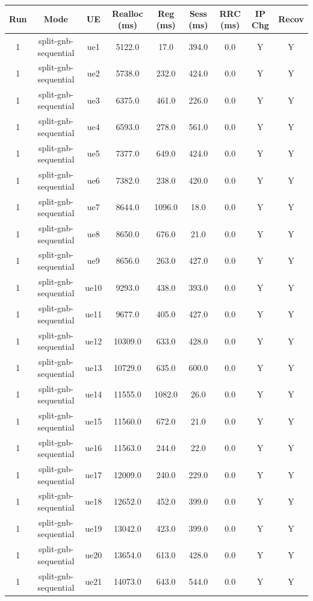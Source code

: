 \begin{table}[ht]
\centering
\begin{tabular}{|c|c|c|c|c|c|c|c|c|}
\hline
Run & Mode & UE & Realloc (ms) & Reg (ms) & Sess (ms) & RRC (ms) & IP Chg & Recov \\
\hline
1 & split-gnb-sequential & ue1 & 5122.0 & 17.0 & 394.0 & 0.0 & Y & Y \\
1 & split-gnb-sequential & ue2 & 5738.0 & 232.0 & 424.0 & 0.0 & Y & Y \\
1 & split-gnb-sequential & ue3 & 6375.0 & 461.0 & 226.0 & 0.0 & Y & Y \\
1 & split-gnb-sequential & ue4 & 6593.0 & 278.0 & 561.0 & 0.0 & Y & Y \\
1 & split-gnb-sequential & ue5 & 7377.0 & 649.0 & 424.0 & 0.0 & Y & Y \\
1 & split-gnb-sequential & ue6 & 7382.0 & 238.0 & 420.0 & 0.0 & Y & Y \\
1 & split-gnb-sequential & ue7 & 8644.0 & 1096.0 & 18.0 & 0.0 & Y & Y \\
1 & split-gnb-sequential & ue8 & 8650.0 & 676.0 & 21.0 & 0.0 & Y & Y \\
1 & split-gnb-sequential & ue9 & 8656.0 & 263.0 & 427.0 & 0.0 & Y & Y \\
1 & split-gnb-sequential & ue10 & 9293.0 & 438.0 & 393.0 & 0.0 & Y & Y \\
1 & split-gnb-sequential & ue11 & 9677.0 & 405.0 & 427.0 & 0.0 & Y & Y \\
1 & split-gnb-sequential & ue12 & 10309.0 & 633.0 & 428.0 & 0.0 & Y & Y \\
1 & split-gnb-sequential & ue13 & 10729.0 & 635.0 & 600.0 & 0.0 & Y & Y \\
1 & split-gnb-sequential & ue14 & 11555.0 & 1082.0 & 26.0 & 0.0 & Y & Y \\
1 & split-gnb-sequential & ue15 & 11560.0 & 672.0 & 21.0 & 0.0 & Y & Y \\
1 & split-gnb-sequential & ue16 & 11563.0 & 244.0 & 22.0 & 0.0 & Y & Y \\
1 & split-gnb-sequential & ue17 & 12009.0 & 240.0 & 229.0 & 0.0 & Y & Y \\
1 & split-gnb-sequential & ue18 & 12652.0 & 452.0 & 399.0 & 0.0 & Y & Y \\
1 & split-gnb-sequential & ue19 & 13042.0 & 423.0 & 399.0 & 0.0 & Y & Y \\
1 & split-gnb-sequential & ue20 & 13654.0 & 613.0 & 428.0 & 0.0 & Y & Y \\
1 & split-gnb-sequential & ue21 & 14073.0 & 643.0 & 544.0 & 0.0 & Y & Y \\

\end{tabular}
\end{table}

